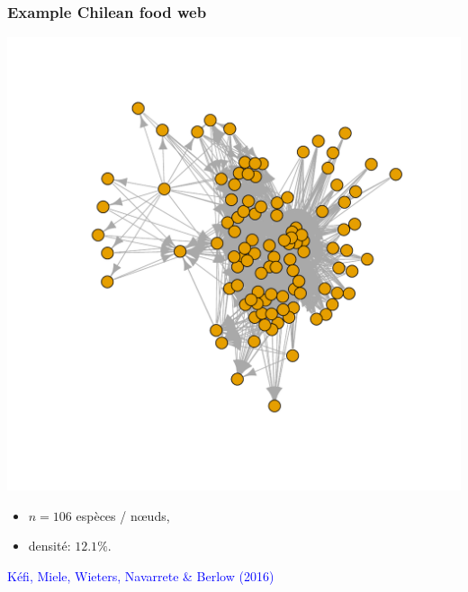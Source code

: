 \documentclass[nopagenumber,9pt]{beamer}
\begin{document}
\begin{frame}
 \frametitle{Example Chilean food web}
 
\begin{center}
\includegraphics[scale=.3]{plots/chilean_food_web.pdf} 
\end{center}

\begin{itemize}
 \item $n=106$ espèces / n\oe uds,
 \item densité: $12.1\%$.
\end{itemize}


\textcolor{blue}{Kéfi, Miele, Wieters, Navarrete \& Berlow (2016)}

\end{frame}
\end{document}
